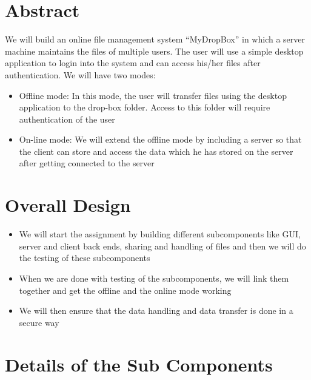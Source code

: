 \documentclass{article}
\title{\vspace{-2cm}{Assignment 1: COP 290: Design Document}}
\author{Aniket Khandelwal(2013CS10209),
		Anupam Khandelwal(2013CS10212),\\
		Ronak Khandelwal(2013CS50295)
}
\date{\today}
\begin{document}
	\maketitle

	\tableofcontents
	\pagebreak

	\section{Abstract}
		We will build an online file management system ``MyDropBox''  in which a server machine maintains the files of multiple users. The user will use  a simple desktop application to login into the system and can access his/her files after authentication. We will have two modes:
		\begin{itemize}
			\item Offline mode: In this mode, the user will transfer files using the desktop application to the drop-box folder. Access to this folder will require authentication of the user
			\item On-line mode: We will extend the offline mode by including a server so that the client can store and access the data which he has stored on the server after getting connected to the server
		\end{itemize}
	\section{Overall Design}
		\begin{itemize}
			\item We will start the assignment by building different subcomponents like GUI, server and client back ends, sharing and handling of files and then we will do the testing of these subcomponents
			\item When we are done with testing of the subcomponents, we will link them together and get the offline and the online mode working
			\item We will then ensure that the data handling and data transfer is done in a secure way
		\end{itemize}

	\section{Details of the Sub Components}
\end{document}
